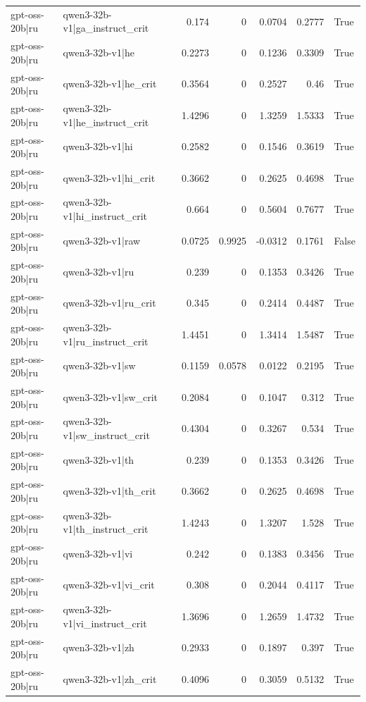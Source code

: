 \begin{table}
\begin{tabular}{l l r r r r l}
gpt-oss-20b|ru & qwen3-32b-v1|ga_instruct_crit & 0.174 & 0 & 0.0704 & 0.2777 & True \\
gpt-oss-20b|ru & qwen3-32b-v1|he & 0.2273 & 0 & 0.1236 & 0.3309 & True \\
gpt-oss-20b|ru & qwen3-32b-v1|he_crit & 0.3564 & 0 & 0.2527 & 0.46 & True \\
gpt-oss-20b|ru & qwen3-32b-v1|he_instruct_crit & 1.4296 & 0 & 1.3259 & 1.5333 & True \\
gpt-oss-20b|ru & qwen3-32b-v1|hi & 0.2582 & 0 & 0.1546 & 0.3619 & True \\
gpt-oss-20b|ru & qwen3-32b-v1|hi_crit & 0.3662 & 0 & 0.2625 & 0.4698 & True \\
gpt-oss-20b|ru & qwen3-32b-v1|hi_instruct_crit & 0.664 & 0 & 0.5604 & 0.7677 & True \\
gpt-oss-20b|ru & qwen3-32b-v1|raw & 0.0725 & 0.9925 & -0.0312 & 0.1761 & False \\
gpt-oss-20b|ru & qwen3-32b-v1|ru & 0.239 & 0 & 0.1353 & 0.3426 & True \\
gpt-oss-20b|ru & qwen3-32b-v1|ru_crit & 0.345 & 0 & 0.2414 & 0.4487 & True \\
gpt-oss-20b|ru & qwen3-32b-v1|ru_instruct_crit & 1.4451 & 0 & 1.3414 & 1.5487 & True \\
gpt-oss-20b|ru & qwen3-32b-v1|sw & 0.1159 & 0.0578 & 0.0122 & 0.2195 & True \\
gpt-oss-20b|ru & qwen3-32b-v1|sw_crit & 0.2084 & 0 & 0.1047 & 0.312 & True \\
gpt-oss-20b|ru & qwen3-32b-v1|sw_instruct_crit & 0.4304 & 0 & 0.3267 & 0.534 & True \\
gpt-oss-20b|ru & qwen3-32b-v1|th & 0.239 & 0 & 0.1353 & 0.3426 & True \\
gpt-oss-20b|ru & qwen3-32b-v1|th_crit & 0.3662 & 0 & 0.2625 & 0.4698 & True \\
gpt-oss-20b|ru & qwen3-32b-v1|th_instruct_crit & 1.4243 & 0 & 1.3207 & 1.528 & True \\
gpt-oss-20b|ru & qwen3-32b-v1|vi & 0.242 & 0 & 0.1383 & 0.3456 & True \\
gpt-oss-20b|ru & qwen3-32b-v1|vi_crit & 0.308 & 0 & 0.2044 & 0.4117 & True \\
gpt-oss-20b|ru & qwen3-32b-v1|vi_instruct_crit & 1.3696 & 0 & 1.2659 & 1.4732 & True \\
gpt-oss-20b|ru & qwen3-32b-v1|zh & 0.2933 & 0 & 0.1897 & 0.397 & True \\
gpt-oss-20b|ru & qwen3-32b-v1|zh_crit & 0.4096 & 0 & 0.3059 & 0.5132 & True \\

\end{tabular}
\end{table}
